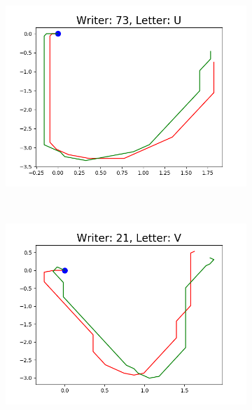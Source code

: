 \begin{figure}
\begin{subfigure}[b]{0.17\textwidth}
          \includegraphics[width=\textwidth]{images/framework/comparison_figures/U_73.png}
      \end{subfigure}
      ~
      \begin{subfigure}[b]{0.17\textwidth}
          \includegraphics[width=\textwidth]{images/framework/comparison_figures/V_21.png}
      \end{subfigure}
      ~
      \begin{subfigure}[b]{0.17\textwidth}

\end{subfigure}
\end{figure}

